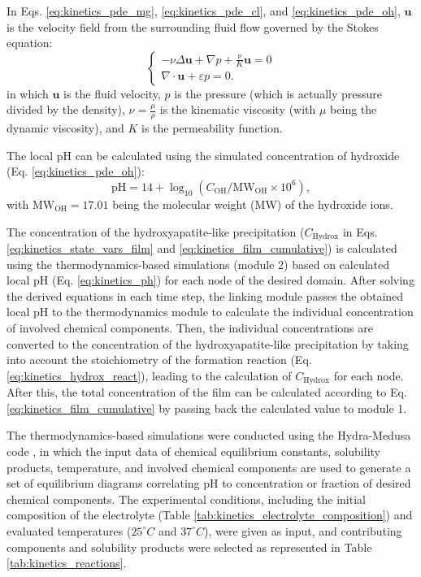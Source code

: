 In Eqs. \ref{eq:kinetics_pde_mg}, \ref{eq:kinetics_pde_cl}, and \ref{eq:kinetics_pde_oh}, $\mathbf{u}$ is the velocity field from the surrounding fluid flow governed by the Stokes equation:
\begin{equation} \label{eq:kinetics_stokes}
\left\{ {\begin{array}{*{20}{l}}
\displaystyle  {- \nu\Delta \mathbf{u} + \nabla p + \frac{\nu}{K} \mathbf{u} = 0} \\
\displaystyle  {\nabla\cdot\mathbf{u} + \varepsilon p = 0.}
\end{array}} \right.
\end{equation}
in which $\mathbf{u}$ is the fluid velocity, $p$ is the pressure (which is actually pressure divided by the density), $\nu = \frac{\mu}{\rho}$ is the kinematic viscosity (with $\mu$ being the dynamic viscosity), and $K$ is the permeability function.


The local pH can be calculated using the simulated concentration of hydroxide (Eq. \ref{eq:kinetics_pde_oh}):
\begin{equation} \label{eq:kinetics_ph}
\mathrm{pH} = 14 + \log_{10}\left(C_{\mathrm{OH}} / \mathrm{MW}_{\mathrm{OH}} \times 10^6\right),
\end{equation}
with $\mathrm{MW}_{\mathrm{OH}}=17.01$ being the molecular weight (\gls{MW}) of the hydroxide ions.

The concentration of the hydroxyapatite-like precipitation ($C_{\mathrm{Hydrox}}$ in Eqs. \ref{eq:kinetics_state_vars_film} and \ref{eq:kinetics_film_cumulative}) is calculated using the thermodynamics-based simulations (module 2) based on calculated local pH (Eq. \ref{eq:kinetics_ph}) for each node of the desired domain. After solving the derived equations in each time step, the linking module passes the obtained local pH to the thermodynamics module to calculate the individual concentration of involved chemical components. Then, the individual concentrations are converted to the concentration of the hydroxyapatite-like precipitation by taking into account the stoichiometry of the formation reaction (Eq. \ref{eq:kinetics_hydrox_react}), leading to the calculation of $C_{\mathrm{Hydrox}}$ for each node. After this, the total concentration of the film can be calculated according to Eq. \ref{eq:kinetics_film_cumulative} by passing back the calculated value to module 1.

The thermodynamics-based simulations were conducted using the Hydra-Medusa code \cite{Ingri1967, Warnqvist1971, Eriksson1979}, in which the input data of chemical equilibrium constants, solubility products, temperature, and involved chemical components are used to generate a set of equilibrium diagrams correlating pH to concentration or fraction of desired chemical components. The experimental conditions, including the initial composition of the electrolyte (Table \ref{tab:kinetics_electrolyte_composition}) and evaluated temperatures ($25^{\circ}C$ and $37^{\circ}C$), were given as input, and contributing components and solubility products were selected as represented in Table \ref{tab:kinetics_reactions}.


